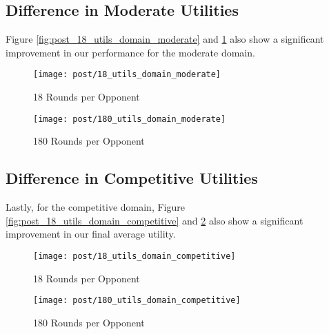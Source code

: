 \subsection{Difference in Moderate Utilities}

Figure \ref{fig:post_18_utils_domain_moderate} and \ref{fig:post_180_utils_domain_moderate} also show a significant improvement in our performance for the moderate domain.

\begin{figure}[H]
	\texttt{[image: post/18\_utils\_domain\_moderate]}
	\caption{18 Rounds per Opponent}
	\label{fig:post_18_utils_domain_moderate}
	\endminipage\hfill
	\texttt{[image: post/180\_utils\_domain\_moderate]}
	\caption{180 Rounds per Opponent}
	\label{fig:post_180_utils_domain_moderate}
	\endminipage\hfill
\end{figure}

\subsection{Difference in Competitive Utilities}

Lastly, for the competitive domain, Figure \ref{fig:post_18_utils_domain_competitive} and \ref{fig:post_180_utils_domain_competitive} also show a significant improvement in our final average utility.

\begin{figure}[H]
	\texttt{[image: post/18\_utils\_domain\_competitive]}
	\caption{18 Rounds per Opponent}
	\label{fig:post_18_utils_domain_competitive}
	\endminipage\hfill
	\texttt{[image: post/180\_utils\_domain\_competitive]}
	\caption{180 Rounds per Opponent}
	\label{fig:post_180_utils_domain_competitive}
	\endminipage\hfill
\end{figure}